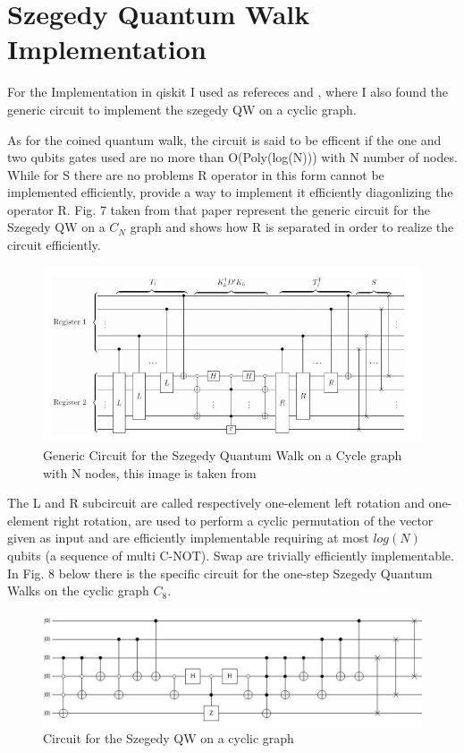 \section{Szegedy Quantum Walk Implementation}

For the Implementation in qiskit I used as refereces \cite{Loke_2017} and \cite{c2dacf48ddf341aca084f825d3787894}, where I also found the generic circuit 
to implement the szegedy QW on a cyclic graph.

As for the coined quantum walk, the circuit is said to be efficent if the one and two qubits gates used are no more than O(Poly(log(N))) with N number of nodes. 
While for S there are no problems R operator in this
form cannot be implemented efficiently, \cite{Loke_2017} provide a way to implement it efficiently diagonlizing the operator R. Fig. 7 taken from that
paper represent the generic circuit for the Szegedy QW on a $C_{N}$ graph and shows how R is separated in order to realize the circuit efficiently. 


\begin{figure}[h!]
    \centering   
    \includegraphics[scale=0.4]{img/generic_szegedy.jpg}
    \caption{Generic Circuit for the Szegedy Quantum Walk on a Cycle graph with N nodes, this image is taken from}
\end{figure}

The L and R subcircuit are called respectively one-element left rotation and one-element right rotation, are used to perform a cyclic permutation
of the vector given as input and are efficiently implementable requiring at most $log(N)$ qubits (a sequence of multi C-NOT). Swap are trivially 
efficiently implementable. In Fig. 8 below there is the specific circuit for the one-step Szegedy Quantum Walks on the cyclic graph $C_{8}$.

\begin{figure}[h!]
    \centering   
    \includegraphics[scale=0.25]{img/szegedy_c8.jpg}
    \caption{Circuit for the Szegedy QW on a cyclic graph}
\end{figure}

